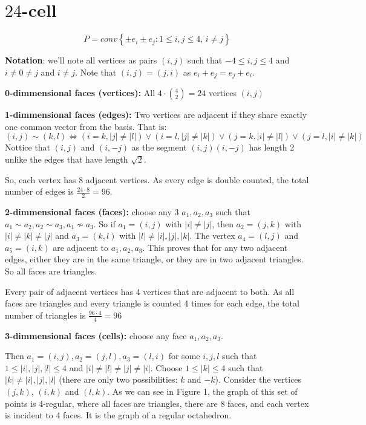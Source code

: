 \documentclass[paper=a4, fontsize=11pt]{scrartcl} %
\theoremstyle{plain}
\begin{document}
\section{$24$-cell}

$$ P = conv\left\lbrace \pm e_i \pm e_j : 1\leq i,j\leq 4,\, i\neq j \right\rbrace$$

\textbf{Notation}: we'll note all vertices as pairs $(i,j)$ such that $ -4 \leq i,j \leq 4$ and $i \neq 0 \neq j$ and $i \neq j$. Note that $(i,j)=(j,i)$ as $e_i+e_j = e_j + e_i$.

\textbf{0-dimmensional faces (vertices):} All $4 \cdot {4 \choose 2} = 24$ vertices $(i,j)$

\textbf{1-dimmensional faces (edges):} Two vertices are adjacent if they share exactly one common vector from the basis. That is:
$$(i,j) \sim (k,l) \iff (i=k,\vert j \vert \neq \vert l \vert) \vee (i=l,\vert j \vert \neq \vert k \vert) \vee (j=k,\vert i \vert \neq \vert l \vert) \vee (j=l,\vert i \vert \neq \vert k \vert)$$
Nottice that $(i,j)$ and $(i,-j)$ as the segment $(i,j)(i,-j)$ has length 2 unlike the edges that have length $\sqrt{2}$.

So, each vertex has 8 adjacent vertices. As every edge is double counted, the total number of edges is $\frac{24 \cdot 8}{2} = 96$.

\textbf{2-dimmensional faces (faces):} choose any 3 $a_1,a_2,a_3$ such that $a_1 \sim a_2, a_2 \sim a_3, a_1 \nsim a_3$.
So if $a_1 = (i,j)$ with $\vert i \vert \neq \vert j \vert$, then $a_2 = (j,k)$ with $\vert i \vert \neq \vert k \vert \neq \vert j \vert$ and $a_3 = (k,l)$ with $\vert l \vert \neq \vert i \vert, \vert j \vert, \vert k \vert$. The vertex $a_4=(l,j)$ and $a_5=(i,k)$ are adjacent to $a_1,a_2,a_3$. This proves that for any two adjacent edges, either they are in the same triangle, or they are in two adjacent triangles. So all faces are triangles.

Every pair of adjacent vertices has 4 vertices that are adjacent to both. As all faces are triangles and every triangle is counted 4 times for each edge, the total number of triangles is $\frac{96 \cdot 4}{4} = 96$ 

\textbf{3-dimmensional faces (cells):} choose any face $a_1,a_2,a_3$.

Then $a_1 = (i,j), a_2=(j,l), a_3=(l,i)$ for some $i,j,l$ such that $1 \leq \vert i \vert, \vert j \vert, \vert l \vert \leq 4$ and $\vert i \vert \neq \vert l \vert \neq \vert j \vert \neq \vert i \vert$. Choose $ 1 \leq \vert k \vert \leq 4 $ such that $\vert k \vert \neq \vert i \vert, \vert j \vert, \vert l \vert$ (there are only two possibilities: $k$ and $-k$). Consider the vertices $(j,k)$, $(i,k)$ and $(l,k)$. As we can see in Figure 1, the graph of this set of points is 4-regular, where all faces are triangles, there are 8 faces, and each vertex is incident to 4 faces. It is the graph of a regular octahedron.
\end{document}
